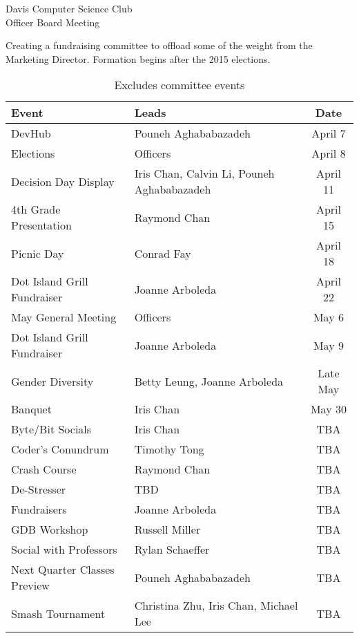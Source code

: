 \documentclass{article}
\begin{document}
\begin{Minutes}{Davis Computer Science Club\\Officer Board Meeting}

Creating a fundraising committee to offload some of the weight from the Marketing Director. Formation begins after the 2015 elections.


\begin{table}[h]
	\centering
	\renewcommand*{\arraystretch}{1.5}
	\begin{tabular}{l l c}
		Event
			&	Leads
			&	Date\\
		\hline
		DevHub
			&	Pouneh Aghababazadeh
			&	April 7\\
		Elections
			&	Officers
			&	April 8\\
		Decision Day Display
			&	Iris Chan, Calvin Li, Pouneh Aghababazadeh
			&	April 11\\
		4th Grade Presentation	
			&	Raymond Chan
			&	April 15\\
		Picnic Day
			&	Conrad Fay
			&	April 18\\
		Dot Island Grill Fundraiser
			&	Joanne Arboleda
			&	April 22\\
		May General Meeting
			&	Officers
			&	May 6\\
		Dot Island Grill Fundraiser
			&	Joanne Arboleda
			&	May 9\\
		Gender Diversity	
			&	Betty Leung, Joanne Arboleda	
			&	Late May\\
		Banquet
			&	Iris Chan
			&	May 30\\
		Byte/Bit Socials
			& 	Iris Chan
			&	TBA\\
		Coder's Conundrum	
			&	Timothy Tong	
			&	TBA\\
		Crash Course
			&	Raymond Chan
			&	TBA\\
		De-Stresser
			&	TBD
			&	TBA\\
		Fundraisers
			&	Joanne Arboleda
			& 	TBA\\
		GDB Workshop		
			&	Russell Miller	
			&	TBA\\
		Social with Professors
			&	Rylan Schaeffer
			&	TBA\\
		Next Quarter Classes Preview
			&	Pouneh Aghababazadeh
			&	TBA\\
		Smash Tournament	
			&	Christina Zhu, Iris Chan, Michael Lee
			&	TBA\\
	\end{tabular}
	\caption*{Excludes committee events}
\end{table}


\end{Minutes}
\end{document}
